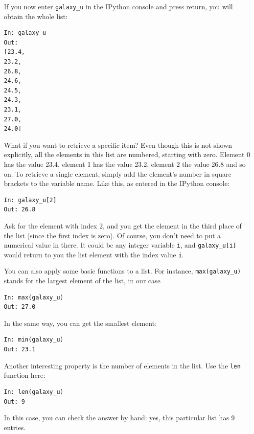\documentclass[twocolumn,apj]{openjournal}
\begin{document}
If you now enter \verb|galaxy_u| in the IPython console and press return, you will obtain the whole list:
\begin{lstlisting}
In: galaxy_u
Out:
[23.4,
23.2, 
26.8, 
24.6, 
24.5, 
24.3, 
23.1, 
27.0, 
24.0]
\end{lstlisting}
What if you want to retrieve a specific item? Even though this is not shown explicitly, all the elements in this list are numbered, starting with zero. Element 0 has the value 23.4, element 1 has the value 23.2, element 2 the value 26.8 and so on. To retrieve a single element, simply add the element's number in square brackets to the variable name. Like this, as entered in the IPython console:
\begin{lstlisting}
In: galaxy_u[2]
Out: 26.8
\end{lstlisting}
Ask for the element with index 2, and you get the element in the third place of the list (since the first index is zero). Of course, you don't need to put a numerical value in there. It could be any integer variable \verb|i|, and \verb|galaxy_u[i]| would return to you the list element with the index value \verb|i|.

You can also apply some basic functions to a list. For instance, \verb|max(galaxy_u)| stands for the largest element of the list, in our case
\begin{lstlisting}
In: max(galaxy_u)
Out: 27.0
\end{lstlisting}
In the same way, you can get the smallest element:
\begin{lstlisting}
In: min(galaxy_u)
Out: 23.1
\end{lstlisting}
Another interesting property is the number of elements in the list. Use the \verb|len| function here:
\begin{lstlisting}
In: len(galaxy_u)
Out: 9
\end{lstlisting}
In this case, you can check the answer by hand: yes, this particular list has 9 entries.
 
\end{document}
